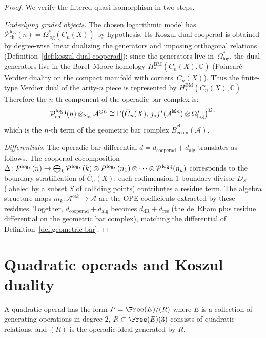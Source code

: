 \begin{proof}
We verify the filtered quasi-isomorphism in two steps.

\emph{Underlying graded objects.}
The chosen logarithmic model has
$\mathcal{P}_{\mathrm{ch}}^{\log}(n)
= \Omega^*_{\log}(\overline{C}_n(X))$
by hypothesis. Its Koszul dual cooperad is obtained by
degree-wise linear dualizing the generators and imposing
orthogonal relations
(Definition~\ref{def:koszul-dual-cooperad}): since the
generators live in~$\Omega^*_{\log}$, the dual generators
live in the Borel--Moore homology
$H_*^{\mathrm{BM}}(\overline{C}_n(X), \mathbb{C})$
(Poincar\'e--Verdier duality on the compact manifold with
corners~$\overline{C}_n(X)$). Thus the finite-type Verdier dual
of the arity-$n$ piece is represented by
$H_*^{\mathrm{BM}}(\overline{C}_n(X), \mathbb{C})$.
Therefore the $n$-th component of the operadic bar complex is:
\[
\mathcal{P}_{\mathrm{ch}}^{\log,\text{\textexclamdown}}(n)
\otimes_{\Sigma_n} \mathcal{A}^{\otimes n}
\cong \Gamma\bigl(\overline{C}_n(X),\,
j_* j^*(\mathcal{A}^{\boxtimes n}) \otimes \Omega^*_{\log}\bigr)^{\Sigma_n}
\]
which is the $n$-th term of the geometric bar complex
$\bar{B}^{\mathrm{ch}}_{\mathrm{geom}}(\mathcal{A})$.

\emph{Differentials.}
The operadic bar differential $d = d_{\mathrm{cooperad}} +
d_{\mathrm{alg}}$ translates as follows.
The cooperad cocomposition
$\Delta\colon \mathcal{P}^{\log,\text{\textexclamdown}}(n)
\to \bigoplus_{k}
\mathcal{P}^{\log,\text{\textexclamdown}}(k) \otimes
\mathcal{P}^{\log,\text{\textexclamdown}}(n_1) \otimes \cdots
\otimes \mathcal{P}^{\log,\text{\textexclamdown}}(n_k)$
corresponds to the boundary stratification of $\overline{C}_n(X)$:
each codimension-$1$ boundary divisor $D_S$ (labeled by a subset $S$ of
colliding points) contributes a residue term. The algebra structure maps
$m_k\colon \mathcal{A}^{\otimes k} \to \mathcal{A}$ are the OPE
coefficients extracted by these residues. Together,
$d_{\mathrm{cooperad}} + d_{\mathrm{alg}}$ becomes
$d_{\mathrm{dR}} + d_{\mathrm{res}}$
(the de~Rham plus residue differential on the geometric bar complex),
matching the differential of
Definition~\ref{def:geometric-bar}.
\end{proof}

\section{Quadratic operads and Koszul duality}

\begin{definition}
A quadratic operad has the form $P = \Free(E)/(R)$ where $E$ is a collection of generating operations in degree $2$, $R \subset \Free(E)(3)$ consists of quadratic relations, and $(R)$ is the operadic ideal generated by $R$.
\end{definition}

